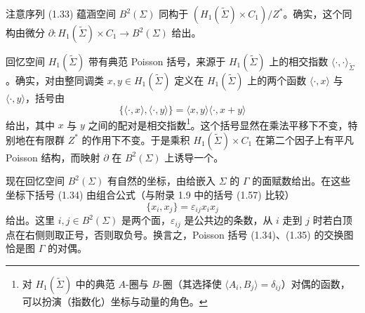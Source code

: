 注意序列 (1.33) 蕴涵空间 $B^2(\Sigma)$ 同构于 $(H_1(\tilde\Sigma)\times C_1)/Z^*$。确实，这个同构由微分 $\partial: H_1(\tilde\Sigma)\times C_1\to B^2(\Sigma)$ 给出。

回忆空间 $H_1(\tilde\Sigma)$ 带有典范 Poisson 括号，来源于 $H_1(\tilde\Sigma)$ 上的相交指数 $\langle\cdot,\cdot\rangle_{\tilde\Sigma}$。确实，对由整同调类 $x,y\in H_1(\tilde\Sigma)$ 定义在 $H_1(\tilde\Sigma)$ 上的两个函数 $\langle\cdot,x\rangle$ 与 $\langle\cdot,y\rangle$，括号由
\begin{equation}\label{eq:1.34}
\{\langle\cdot,x\rangle,\langle\cdot,y\rangle\}=\langle x,y\rangle\langle\cdot,x+y\rangle
\tag{1.34}
\end{equation}
给出，其中 $x$ 与 $y$ 之间的配对是相交指数\footnote{对 $H_1(\tilde\Sigma)$ 中的典范 $A$-圈与 $B$-圈（其选择使 $\langle A_i,B_j\rangle=\delta_{ij}$）对偶的函数，可以扮演（指数化）坐标与动量的角色。}。这个括号显然在乘法平移下不变，特别地在有限群 $Z^*$ 的作用下不变。于是乘积 $H_1(\tilde\Sigma)\times C_1$ 在第二个因子上有平凡 Poisson 结构，而映射 $\partial$ 在 $B^2(\Sigma)$ 上诱导一个。

现在回忆空间 $B^2(\Sigma)$ 有自然的坐标，由给嵌入 $\Sigma$ 的 $\Gamma$ 的面赋数给出。在这些坐标下括号 (1.34) 由组合公式（与附录 1.9 中的括号 (1.57) 比较）
\begin{equation}\label{eq:1.35}
\{x_i,x_j\}=\varepsilon_{ij}x_ix_j
\tag{1.35}
\end{equation}
给出。这里 $i,j\in B^2(\Sigma)$ 是两个面，$\varepsilon_{ij}$ 是公共边的条数，从 $i$ 走到 $j$ 时若白顶点在右侧则取正号，否则取负号。换言之，Poisson 括号 (1.34)、(1.35) 的交换图恰是图 $\Gamma$ 的对偶。
